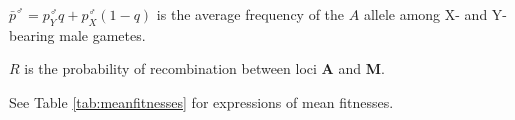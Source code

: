 \documentclass[12pt]{article}
\begin{document}
\begin{threeparttable}[ht]
\begin{tabular}{l}
  \hline \hline 
   \end{tabular}
      \begin{tablenotes}
      \scriptsize
      \item $\bar{p}^{\male}=p_{Y}^{\male}q+p_{X}^{\male}(1-q)$ is the average frequency of the $A$ allele among X- and Y-bearing male gametes.
      \item $R$ is the probability of recombination between loci \textbf{A} and \textbf{M}.
      \item See Table \ref{tab:meanfitnesses} for expressions of mean fitnesses.
    \end{tablenotes}
  \label{tab:haplotype_growth}
\end{threeparttable}
\\
\end{document}
